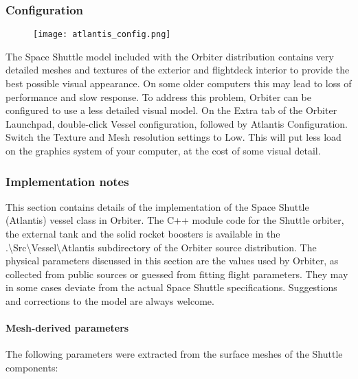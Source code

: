 \documentclass[Orbiter User Manual.tex]{subfiles}
\begin{document}
\subsubsection{Configuration}

\begin{figure}[H]
  \centering
  \texttt{[image: atlantis\_config.png]}
\end{figure}

\noindent
The Space Shuttle model included with the Orbiter distribution contains very detailed meshes and textures of the exterior and flightdeck interior to provide the best possible visual appearance. On some older computers this may lead to loss of performance and slow response. To address this problem, Orbiter can be configured to use a less detailed visual model.
On the Extra tab of the Orbiter Launchpad, double-click Vessel configuration, followed by Atlantis Configuration. Switch the Texture and Mesh resolution settings to Low. This will put less load on the graphics system of your computer, at the cost of some visual detail.

\subsubsection{Implementation notes}
This section contains details of the implementation of the Space Shuttle (Atlantis) vessel class in Orbiter. The C++ module code for the Shuttle orbiter, the external tank and the solid rocket boosters is available in the .\textbackslash Src\textbackslash Vessel\textbackslash Atlantis subdirectory of the Orbiter source distribution. The physical parameters discussed in this section are the values used by Orbiter, as collected from public sources or guessed from fitting flight parameters. They may in some cases deviate from the actual Space Shuttle specifications. Suggestions and corrections to the model are always welcome.

\paragraph{Mesh-derived parameters}
The following parameters were extracted from the surface meshes of the Shuttle components:
\end{document}
